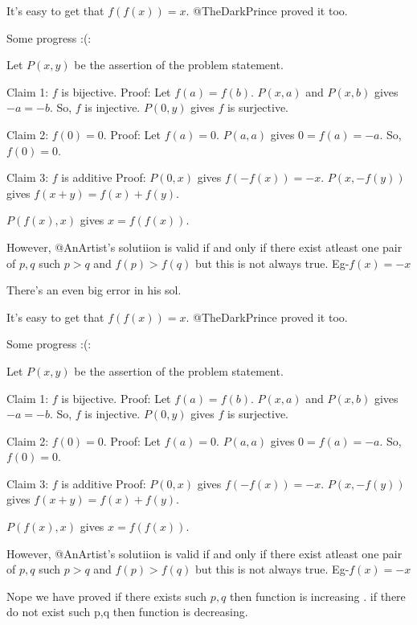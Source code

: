 \begin{solution}
	\begin{tcolorbox}It's easy to get that $f(f(x))=x$. @TheDarkPrince proved it too.

\begin{tcolorbox}Some progress :(:

Let $P(x,y)$ be the assertion of the problem statement.

Claim 1: $f$ is bijective.
Proof: Let $f(a)=f(b)$. $P(x,a)$ and $P(x,b)$ gives $-a=-b$. So, $f$ is injective. $P(0,y)$ gives $f$ is surjective.

Claim 2: $f(0)=0$.
Proof: Let $f(a)=0$. $P(a,a)$ gives $0=f(a)=-a$. So, $f(0)=0$.

Claim 3: $f$ is additive
Proof: $P(0,x)$ gives $f(-f(x))=-x$. $P(x,-f(y))$ gives $f(x+y)=f(x)+f(y)$.

$P(f(x),x)$ gives $x=f(f(x))$.\end{tcolorbox}
However, @AnArtist's solutiion is valid if and only if there exist atleast one pair of $p,q$ such $p>q$ and $f(p)>f(q)$ but this is not always true. Eg-$f(x)=-x$\end{tcolorbox}

There's an even big error in his sol.
\end{solution}



\begin{solution}
	\begin{tcolorbox}It's easy to get that $f(f(x))=x$. @TheDarkPrince proved it too.

\begin{tcolorbox}Some progress :(:

Let $P(x,y)$ be the assertion of the problem statement.

Claim 1: $f$ is bijective.
Proof: Let $f(a)=f(b)$. $P(x,a)$ and $P(x,b)$ gives $-a=-b$. So, $f$ is injective. $P(0,y)$ gives $f$ is surjective.

Claim 2: $f(0)=0$.
Proof: Let $f(a)=0$. $P(a,a)$ gives $0=f(a)=-a$. So, $f(0)=0$.

Claim 3: $f$ is additive
Proof: $P(0,x)$ gives $f(-f(x))=-x$. $P(x,-f(y))$ gives $f(x+y)=f(x)+f(y)$.

$P(f(x),x)$ gives $x=f(f(x))$.\end{tcolorbox}
However, @AnArtist's solutiion is valid if and only if there exist atleast one pair of $p,q$ such $p>q$ and $f(p)>f(q)$ but this is not always true. Eg-$f(x)=-x$\end{tcolorbox}

Nope we have proved if there exists such $p,q$ then function is increasing . if there do not exist such p,q then function is decreasing.
\end{solution}



